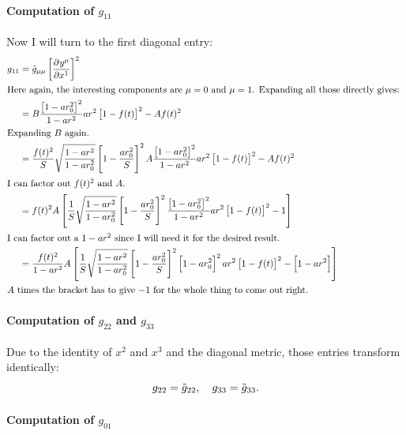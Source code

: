 \paragraph{Computation of $g_{11}$}

Now I will turn to the first diagonal entry:
\begin{align*}
    g_{11}
    &= \tilde g_{\mu\mu} \sbr{\dpd{{y^\mu}}{{x^1}}}^2 \\
    \intertext{%
        Here again, the interesting components are $\mu = 0$ and $\mu = 1$.
        Expanding all those directly gives:
    }
    &= B \frac{\sbr{1 - ar_0^2}^2}{1 - ar^2} ar^2 \sbr{1 - f(t)}^2 - A f(t)^2
    \\
    \intertext{%
        Expanding $B$ again.
    }
    &= \frac{f(t)^2}S \WW \sbr{1 - \frac{ar_0^2}S}^2 A \frac{\sbr{1 -
    ar_0^2}^2}{1 - ar^2} ar^2 \sbr{1 - f(t)}^2 - A f(t)^2 \\
    \intertext{%
        I can factor out $f(t)^2$ and $A$.
    }
    &= f(t)^2 A \sbr{ \frac{1}S \WW \sbr{1 - \frac{ar_0^2}S}^2 \frac{\sbr{1 -
    ar_0^2}^2}{1 - ar^2} ar^2 \sbr{1 - f(t)}^2 - 1} \\
    \intertext{%
        I can factor out a $1 - ar^2$ since I will need it for the desired
        result.
    }
    &= \frac{f(t)^2}{1 - ar^2} A \sbr{ \frac{1}S \WW \sbr{1 - \frac{ar_0^2}S}^2
    \sbr{1 - ar_0^2}^2 ar^2 \sbr{1 - f(t)}^2 - \sbr{1 - ar^2}} \\
    \intertext{%
        $A$ times the bracket has to give $-1$ for the whole thing to come out
        right.
    }
\end{align*}

\paragraph{Computation of $g_{22}$ and $g_{33}$}

Due to the identity of $x^2$ and $x^3$ and the diagonal metric, those entries
transform identically:
\[
    g_{22} = \tilde g_{22}
    ,\quad
    g_{33} = \tilde g_{33}.
\]

\paragraph{Computation of $g_{01}$}

